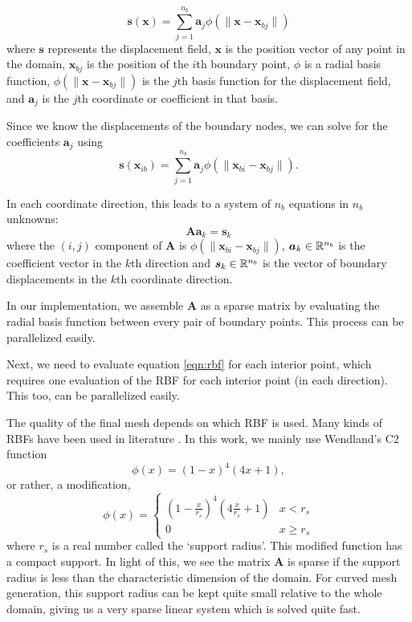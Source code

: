  \begin{equation}
 \mathbf{s}(\mathbf{x}) = \sum_{j=1}^{n_b} \mathbf{a}_j \phi(\lVert\mathbf{x} - \mathbf{x}_{bj}\rVert)
 \label{eqn:rbf}
 \end{equation}
 where $\mathbf{s}$ represents the displacement field, $\mathbf{x}$ is the position vector of any point in the domain, $\mathbf{x}_{bj}$ is the position of the $i$th boundary point, $\phi$ is a radial basis function, $\phi(\lVert\mathbf{x} - \mathbf{x}_{bj}\rVert)$ is the $j$th basis function for the displacement field, and $\mathbf{a}_j$ is the $j$th coordinate or coefficient in that basis.
 
 Since we know the displacements of the boundary nodes, we can solve for the coefficients $\mathbf{a}_j$ using
 \begin{equation}
 \mathbf{s}(\mathbf{x}_{ib}) = \sum_{j=1}^{n_b} \mathbf{a}_j \phi(\lVert\mathbf{x}_{bi} - \mathbf{x}_{bj}\rVert).
 \end{equation}
 
 In each coordinate direction, this leads to a system of $n_b$ equations in $n_b$ unknowns:
 \begin{equation}
 \mathbf{A}\mathbf{a}_k = \mathbf{s}_k
 \end{equation}
 where the $(i,j)$ component of $\mathbf{A}$ is $\phi(\lVert\mathbf{x}_{bi} - \mathbf{x}_{bj} \rVert)$, $ \boldsymbol{a}_k \in \mathbb{R}^{n_b}$ is the coefficient vector in the $k$th direction and $\boldsymbol{s}_k \in \mathbb{R}^{n_b}$ is the vector of boundary displacements in the $k$th coordinate direction.
 
 In our implementation, we assemble $\mathbf{A}$ as a sparse matrix by evaluating the radial basis function between every pair of boundary points. This process can be parallelized easily.
 
 Next, we need to evaluate equation \eqref{eqn:rbf} for each interior point, which requires one evaluation of the RBF for each interior point (in each direction). This too, can be parallelized easily.
 
 The quality of the final mesh depends on which RBF is used. Many kinds of RBFs have been used in literature \cite{mm:rbf, mm:rbf2}. In this work, we mainly use Wendland's C2 function
 \begin{equation}
 \phi(x) = (1-x)^4(4x + 1),
 \end{equation}
 or rather, a modification,
 \begin{equation}
 \phi(x) = 
 \begin{cases}
 \left(1-\frac{x}{r_s}\right)^4\left(4\frac{x}{r_s} + 1\right) & x < r_s \\
 0 & x \geq r_s
 \end{cases}
 \end{equation}
 where $r_s$ is a real number called the `support radius'. This modified function has a compact support. In light of this, we see the matrix $\mathbf{A}$ is sparse if the support radius is less than the characteristic dimension of the domain. For curved mesh generation, this support radius can be kept quite small relative to the whole domain, giving us a very sparse linear system which is solved quite fast.
 
